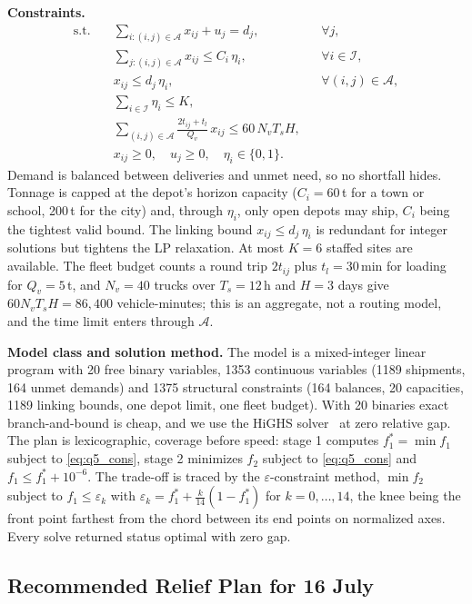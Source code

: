 \textbf{Constraints.}
\begin{equation}
\begin{aligned}
\text{s.t.}\quad
&\sum_{i:(i,j)\in\mathcal A}x_{ij}+u_j=d_j, && \forall j,\\
&\sum_{j:(i,j)\in\mathcal A}x_{ij}\le C_i\,\eta_i, && \forall i\in\mathcal I,\\
&x_{ij}\le d_j\,\eta_i, && \forall (i,j)\in\mathcal A,\\
&\sum_{i\in\mathcal I}\eta_i\le K,\\
&\sum_{(i,j)\in\mathcal A}\frac{2t_{ij}+t_l}{Q_v}\,x_{ij}\le 60\,N_vT_sH,\\
&x_{ij}\ge0,\quad u_j\ge0,\quad \eta_i\in\{0,1\}.
\end{aligned}
\label{eq:q5_cons}
\end{equation}
Demand is balanced between deliveries and unmet need, so no shortfall hides. Tonnage is capped at the depot's horizon capacity ($C_i=60$\,t for a town or school, 200\,t for the city) and, through $\eta_i$, only open depots may ship, $C_i$ being the tightest valid bound. The linking bound $x_{ij}\le d_j\,\eta_i$ is redundant for integer solutions but tightens the LP relaxation. At most $K=6$ staffed sites are available. The fleet budget counts a round trip $2t_{ij}$ plus $t_l=30$\,min for loading for $Q_v=5$\,t, and $N_v=40$ trucks over $T_s=12$\,h and $H=3$ days give $60N_vT_sH=86{,}400$ vehicle-minutes; this is an aggregate, not a routing model, and the time limit enters through $\mathcal A$.

\textbf{Model class and solution method.} The model is a mixed-integer linear program with 20 free binary variables, 1353 continuous variables (1189 shipments, 164 unmet demands) and 1375 structural constraints (164 balances, 20 capacities, 1189 linking bounds, one depot limit, one fleet budget). With 20 binaries exact branch-and-bound is cheap, and we use the HiGHS solver~\cite{huangfu2018highs} at zero relative gap. The plan is lexicographic, coverage before speed: stage 1 computes $f_1^*=\min f_1$ subject to \eqref{eq:q5_cons}, stage 2 minimizes $f_2$ subject to \eqref{eq:q5_cons} and $f_1\le f_1^*+10^{-6}$. The trade-off is traced by the $\varepsilon$-constraint method, $\min f_2$ subject to $f_1\le\varepsilon_k$ with $\varepsilon_k=f_1^*+\frac{k}{14}(1-f_1^*)$ for $k=0,\dots,14$, the knee being the front point farthest from the chord between its end points on normalized axes. Every solve returned status optimal with zero gap.

\subsection{Recommended Relief Plan for 16 July}

